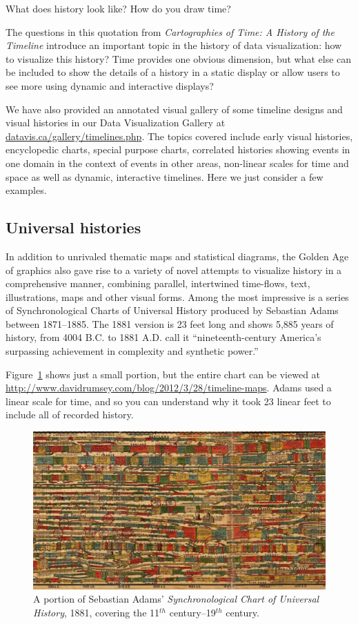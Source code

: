 \documentclass[11pt]{article}
\newcommand*{\figref}[1]{Figure~\ref{#1}}
\newcommand{\Cent}[1]{#1$^{th}$ century}
\begin{document}
\epigraph{What does history look like?  How do you draw time?}{\citet[p. 10]{RosenbergGrafton:2010}}
The questions in this quotation from \emph{Cartographies of Time: A History of the Timeline} \citet{RosenbergGrafton:2010}
introduce an important topic in the history of data visualization: how to visualize this history?
Time provides one obvious dimension, but what else can be included to show the details of a history in a static display
or allow users to see more using dynamic and interactive displays?

We have also provided an annotated visual gallery of some timeline designs and visual histories
in our Data Visualization Gallery at \url{datavis.ca/gallery/timelines.php}. The topics covered
include early visual histories, encyclopedic charts, special purpose charts, correlated histories
showing events in one domain in the context of events in other areas, non-linear scales for
time and space as well as dynamic, interactive timelines.  Here we just consider a few examples.

\subsection{Universal histories}
In addition to unrivaled thematic maps and statistical diagrams, the Golden Age of graphics also
gave rise to a variety of novel attempts to visualize history in a comprehensive manner,
combining parallel, intertwined time-flows, text, illustrations, maps and other visual forms.
Among the most impressive is a series of Synchronological Charts of Universal History
produced by Sebastian Adams between 1871--1885.
The 1881 version is 23 feet long and shows 5,885 years of history, from 4004 B.C. to 1881 A.D.
\citet[p. 172]{RosenbergGrafton:2010} call it ``nineteenth-century America's surpassing achievement in complexity and synthetic power.'' 

\figref{fig:Adams1881} shows just a small portion, but the entire chart can be viewed at
\url{http://www.davidrumsey.com/blog/2012/3/28/timeline-maps}.  Adams used a linear scale for
time, and so you can understand why it took 23 linear feet to include all of recorded history.

\begin{figure}[!htb]
  \centering
  \includegraphics[width=\textwidth,clip]{fig/Adams1881-4}
  \caption{A portion of Sebastian Adams' \emph{Synchronological Chart of Universal History}, 1881,
  covering the \Cent{11}--\Cent{19}.
  }
  \label{fig:Adams1881}
\end{figure}
\end{document}
